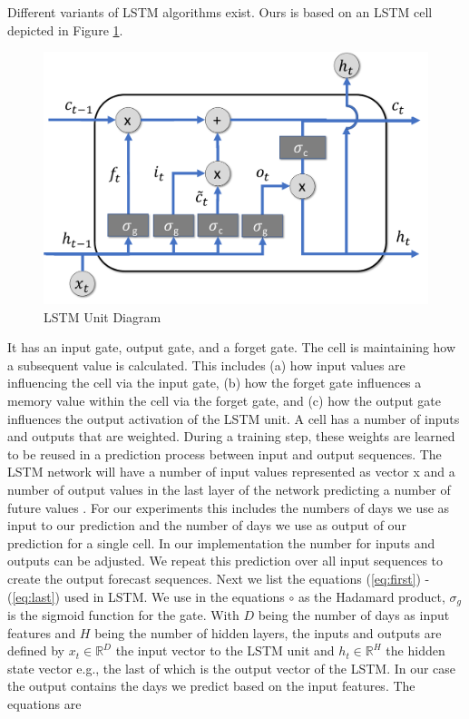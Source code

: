 \documentclass[a4paper, inpress]{jds} %
\renewcommand{\_}{%
    \textunderscore\hspace{0pt}%
}
\begin{document}
Different variants of LSTM algorithms exist. Ours is based on an LSTM
cell depicted in Figure \ref{fig:lstm}.  

\begin{figure}[!htb]
    \centering
    \includegraphics[width=0.6\columnwidth]{images/lstm.pdf}
    \caption{LSTM Unit Diagram}
    \label{fig:lstm}
\end{figure}


\newcommand{\RH}{\mathbb{R}^{H}}
\newcommand{\RD}{\mathbb{R}^{D}}

It has an input gate, output
gate, and a forget gate. The cell is maintaining how a subsequent
value is calculated. This includes (a) how input values are
influencing the cell via the input gate, (b) how the forget gate
influences a memory value within the cell via the forget gate, and (c)
how the output gate influences the output activation of the LSTM
unit. A cell has a number of inputs and outputs that are
weighted. During a training step, these weights are learned to be
reused in a prediction process between input and output sequences.
The LSTM network will have a number of input values represented as vector x and a number of output values in the last layer of the network predicting a number of future values \citep{lstm-explained}. For our experiments this includes the numbers of days we use as input to our prediction and the number of days we use as output of our prediction for a single cell. In our implementation the number for inputs and outputs can be adjusted. We repeat this prediction over all input sequences to create the output forecast sequences. Next we list the equations (\ref{eq:first}) - (\ref{eq:last}) used in LSTM.  We use in the equations $\circ$ as the Hadamard product,
$\sigma_g$ is the sigmoid function for the gate.
With 
$D$ being the number of days as input features and
$H$ being the number of hidden layers, the 
inputs and outputs are defined by  
$x_{t} \in \RD$ the input vector to the LSTM unit and 
$h_{t} \in \RH$ the hidden state vector e.g., the last of which is the output vector of the LSTM. In our case the output contains the days we predict based on the input features. The equations are 
\end{document}
